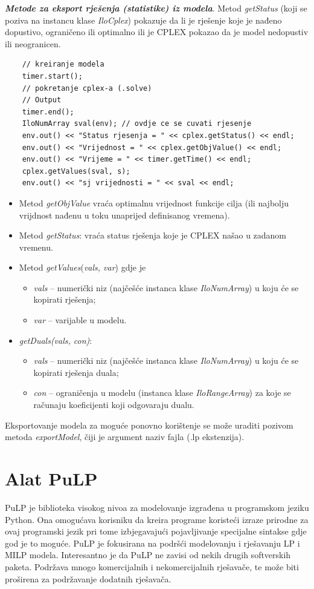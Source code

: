 \documentclass[a4paper, utf8, 11pt, colorlinks]{book}
\begin{document}
 \noindent \textbf{\emph{Metode za eksport rješenja (statistike) iz modela}}. Metod \emph{getStatus} (koji se poziva na instancu klase \emph{IloCplex})  pokazuje da li je rješenje koje je nađeno dopustivo, ograničeno ili optimalno ili je CPLEX pokazao da je model nedopustiv ili neogranicen.
 
 \begin{verbatim}
 	// kreiranje modela 
 	timer.start();
 	// pokretanje cplex-a (.solve)
 	// Output
 	timer.end();
 	IloNumArray sval(env); // ovdje ce se cuvati rjesenje
 	env.out() << "Status rjesenja = " << cplex.getStatus() << endl;
 	env.out() << "Vrijednost = " << cplex.getObjValue() << endl;
 	env.out() << "Vrijeme = " << timer.getTime() << endl;
 	cplex.getValues(sval, s);
 	env.out() << "sj vrijednosti = " << sval << endl;
 \end{verbatim}
\begin{itemize}
	\item Metod \emph{getObjValue} vraća optimalnu vrijednost funkcije cilja (ili najbolju vrijdnost nađenu u toku unaprijed definisanog vremena).
	\item Metod \emph{getStatus}: vraća status rješenja koje je CPLEX našao u zadanom vremenu.
	\item Metod \emph{getValues}(\emph{vals, var}) gdje je 
	\begin{itemize}
	 	  \item \emph{vals} -- numerički niz (najčešće instanca klase \emph{IloNumArray}) u koju će se kopirati rješenja;    
          \item \emph{var} -- varijable u modelu.
    \end{itemize}
     \item \emph{getDuals(vals, con)}:
     \begin{itemize}
     	\item \emph{vals} -- numerički niz (najčešće instanca klase \emph{IloNumArray}) u koju će se kopirati rješenja duala;
     	\item \emph{con} -- ograničenja u modelu (instanca klase \emph{IloRangeArray}) za koje se računaju koeficijenti koji odgovaraju dualu. 
     \end{itemize}
\end{itemize}
Eksportovanje modela za moguće ponovno korištenje se može uraditi pozivom metoda \emph{exportModel}, čiji je argument naziv fajla (.lp ekstenzija).  
 \section{Alat PuLP}
 PuLP je biblioteka visokog nivoa za modelovanje izgrađena u programskom jeziku Python.  
 Ona omogućava korisniku da kreira programe koristeći izraze prirodne za ovaj programski jezik 
 pri tome izbjegavajući pojavljivanje specijalne sintakse gdje god je to moguće. PuLP je fokusirana na podršći modelovanju i rješavanju LP i MILP modela. Interesantno je da PuLP 
 ne zavisi od nekih drugih softverskih paketa.   Podržava mnogo komercijalnih i nekomercijalnih rješavače, te može biti proširena za podržavanje dodatnih rješavača. 
 
\end{document}
